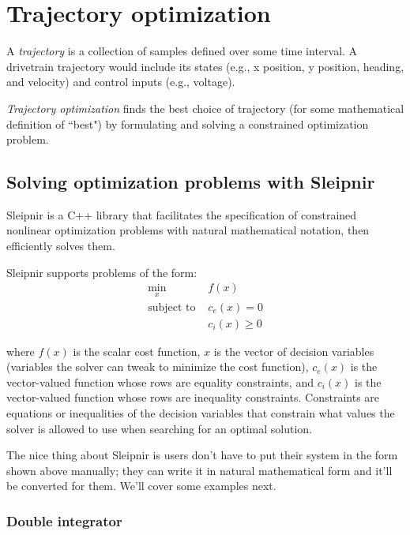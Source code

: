 
\chapter{Trajectory optimization}

A \textit{trajectory} is a collection of samples defined over some time
interval. A drivetrain trajectory would include its states (e.g., x position, y
position, heading, and velocity) and control inputs (e.g., voltage).

\textit{Trajectory optimization} finds the best choice of trajectory (for some
mathematical definition of ``best") by formulating and solving a constrained
optimization problem.

\section{Solving optimization problems with Sleipnir}

Sleipnir is a C++ library that facilitates the specification of constrained
nonlinear optimization problems with natural mathematical notation, then
efficiently solves them.

Sleipnir supports problems of the form:
\begin{align*}
  \min_x             &f(x) \\
  \text{subject to } &c_e(x) = 0 \\
                     &c_i(x) \geq 0
\end{align*}

where $f(x)$ is the scalar cost function, $x$ is the vector of decision
variables (variables the solver can tweak to minimize the cost function),
$c_e(x)$ is the vector-valued function whose rows are equality constraints, and
$c_i(x)$ is the vector-valued function whose rows are inequality constraints.
Constraints are equations or inequalities of the decision variables that
constrain what values the solver is allowed to use when searching for an optimal
solution.

The nice thing about Sleipnir is users don't have to put their system in the
form shown above manually; they can write it in natural mathematical form and
it'll be converted for them. We'll cover some examples next.

\subsection{Double integrator}

